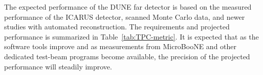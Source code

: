 

The expected performance of the DUNE far detector is based on the measured performance of the ICARUS detector, scanned Monte Carlo data, and newer studies with automated reconstruction. The requirements and projected performance is summarized in Table~\ref{tab:TPC-metric}. It is expected that as the software tools improve and as measurements from MicroBooNE and other dedicated test-beam programs become available, the precision of the projected performance will steadily improve.



